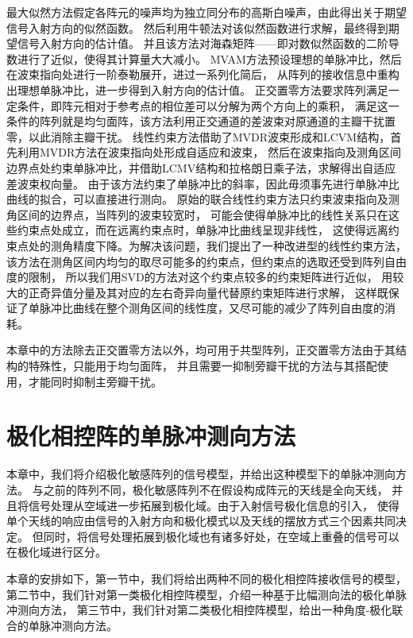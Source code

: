 \documentclass[master]{thesis-uestc}
\begin{document}
最大似然方法假定各阵元的噪声均为独立同分布的高斯白噪声，由此得出关于期望信号入射方向的似然函数。
然后利用牛顿法对该似然函数进行求解，最终得到期望信号入射方向的估计值。
并且该方法对海森矩阵——即对数似然函数的二阶导数进行了近似，使得其计算量大大减小。
MVAM方法预设理想的单脉冲比，然后在波束指向处进行一阶泰勒展开，进过一系列化简后，
从阵列的接收信息中重构出理想单脉冲比，进一步得到入射方向的估计值。
正交置零方法要求阵列满足一定条件，即阵元相对于参考点的相位差可以分解为两个方向上的乘积，
满足这一条件的阵列就是均匀面阵，该方法利用正交通道的差波束对原通道的主瓣干扰置零，以此消除主瓣干扰。
线性约束方法借助了MVDR波束形成和LCVM结构，首先利用MVDR方法在波束指向处形成自适应和波束，
然后在波束指向及测角区间边界点处约束单脉冲比，并借助LCMV结构和拉格朗日乘子法，求解得出自适应差波束权向量。
由于该方法约束了单脉冲比的斜率，因此毋须事先进行单脉冲比曲线的拟合，可以直接进行测向。
原始的联合线性约束方法只约束波束指向及测角区间的边界点，当阵列的波束较宽时，
可能会使得单脉冲比的线性关系只在这些约束点处成立，而在远离约束点时，单脉冲比曲线呈现非线性，
这使得远离约束点处的测角精度下降。为解决该问题，我们提出了一种改进型的线性约束方法，
该方法在测角区间内均匀的取尽可能多的约束点，但约束点的选取还受到阵列自由度的限制，
所以我们用SVD的方法对这个约束点较多的约束矩阵进行近似，
用较大的正奇异值分量及其对应的左右奇异向量代替原约束矩阵进行求解，
这样既保证了单脉冲比曲线在整个测角区间的线性度，又尽可能的减少了阵列自由度的消耗。

本章中的方法除去正交置零方法以外，均可用于共型阵列，正交置零方法由于其结构的特殊性，只能用于均匀面阵，
并且需要一抑制旁瓣干扰的方法与其搭配使用，才能同时抑制主旁瓣干扰。

\chapter{极化相控阵的单脉冲测向方法}
本章中，我们将介绍极化敏感阵列的信号模型，并给出这种模型下的单脉冲测向方法。
与之前的阵列不同，极化敏感阵列不在假设构成阵元的天线是全向天线，
并且将信号处理从空域进一步拓展到极化域。由于入射信号极化信息的引入，
使得单个天线的响应由信号的入射方向和极化模式以及天线的摆放方式三个因素共同决定。
但同时，将信号处理拓展到极化域也有诸多好处，在空域上重叠的信号可以在极化域进行区分。

本章的安排如下，第一节中，我们将给出两种不同的极化相控阵接收信号的模型，
第二节中，我们针对第一类极化相控阵模型，介绍一种基于比幅测向法的极化单脉冲测向方法，
第三节中，我们针对第二类极化相控阵模型，给出一种角度-极化联合的单脉冲测向方法。
\end{document}
